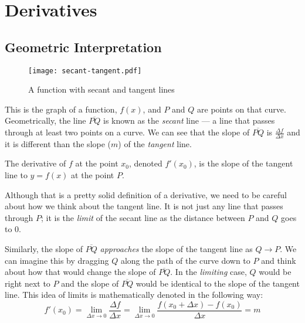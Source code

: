 \documentclass[../main.tex]{subfiles}
\begin{document}
\chapter{Derivatives}
\section{Geometric Interpretation}
\begin{figure}[h]
    \centering
    \texttt{[image: secant-tangent.pdf]}
    \caption{A function with secant and tangent lines}
    \label{fig:secant-tangent}
\end{figure}
This is the graph of a function, $f(x)$, and $P$ and $Q$ are points
on that curve. Geometrically, the line $\overline{PQ}$ is known as the
\emph{secant} line --- a line that passes through at least two points
on a curve. We can see that the slope of $\overline{PQ}$ is 
$\frac{\Delta f}{\Delta x}$ and it is different than the slope ($m$) 
of the \emph{tangent} line.

\begin{defn}
    The derivative of $f$ at the point $x_0$, denoted $f'(x_0)$, is the
    slope of the tangent line to $y=f(x)$ at the point $P$.
    \label{def:derivative}
\end{defn}

Although that is a pretty solid definition of a derivative, 
we need to be careful about how we think about the tangent line. 
It is not just any line that passes through $P$; 
it is the \emph{limit} of the secant line as the distance between 
$P$ and $Q$ goes to $0$.

Similarly, the slope of $\overline{PQ}$ \emph{approaches} the slope of the 
tangent line as $Q \to P$. We can imagine this by dragging $Q$ 
along the path of the curve down to $P$ and think about how that would 
change the slope of $\overline{PQ}$. In the \emph{limiting} case, $Q$ 
would be right next to $P$ and the slope of $\overline{PQ}$ would be 
identical to the slope of the tangent line. 
This idea of limits is mathematically denoted in the following way:
\begin{equation}
    f' \left( x_0 \right) = \lim_{\Delta x \to 0} 
                                \frac
                                    {\Delta f}
                                    {\Delta x}
                          = \lim_{\Delta x \to 0}
                                \frac
                                    {
                                        f \left( x_0 + \Delta x \right)
                                        - f \left( x_0 \right)
                                    }
                                    {\Delta x}
                          = m
    \label{eqn:derivative}
\end{equation}
\end{document}
